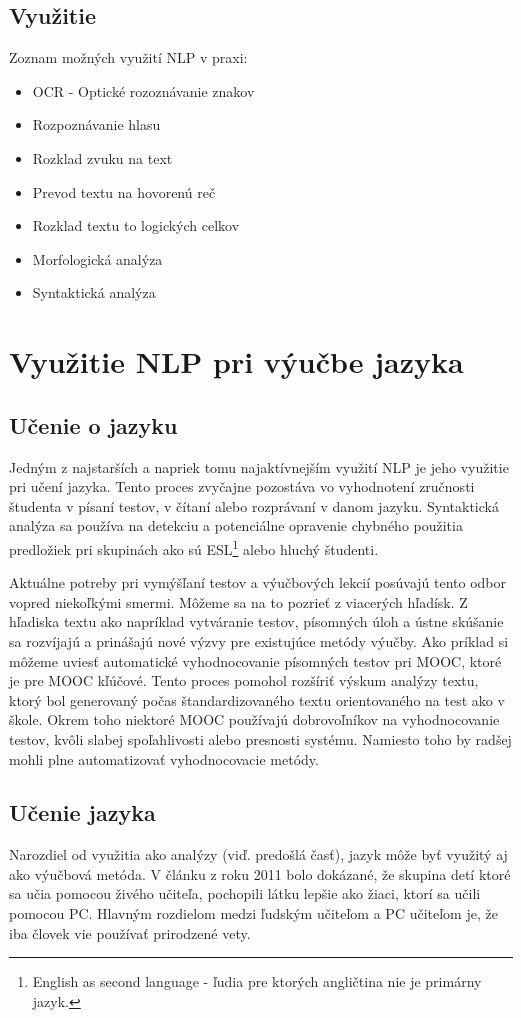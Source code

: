 \documentclass[10pt,slovak,a4paper,twoside]{article}
\begin{document}
\subsection{Využitie}
Zoznam možných využití NLP v praxi:
\begin{itemize}
	\item OCR - Optické rozoznávanie znakov
	\item Rozpoznávanie hlasu
	\item Rozklad zvuku na text
	\item Prevod textu na hovorenú reč
	\item Rozklad textu to logických celkov
	\item Morfologická analýza
	\item Syntaktická analýza
\end{itemize}
\section{Využitie NLP pri výučbe jazyka}\label{vyuzitie_jazyka_nlp}
\subsection{Učenie o jazyku} \label{ucenie_o_jazyku}
		Jedným z najstarších a napriek tomu najaktívnejším využití NLP je jeho využitie pri učení jazyka.
	Tento proces zvyčajne pozostáva vo vyhodnotení zručnosti študenta v písaní testov, v čítaní alebo
	rozprávaní v danom jazyku. Syntaktická analýza sa používa na detekciu a potenciálne opravenie chybného použitia
	predložiek pri skupinách ako sú ESL\footnote{English as second language - ľudia pre ktorých angličtina nie je primárny jazyk.} alebo hluchý študenti.

	Aktuálne potreby pri vymýšľaní testov a výučbových lekcií posúvajú tento odbor vopred niekoľkými smermi. Môžeme sa na to pozrieť z viacerých hľadísk. 
	Z hľadiska textu ako napríklad vytváranie testov, písomných úloh a ústne skúšanie sa rozvíjajú a prinášajú nové výzvy pre existujúce metódy výučby.
	Ako príklad si môžeme uviesť automatické vyhodnocovanie písomných testov pri MOOC, ktoré je pre MOOC kľúčové. Tento proces pomohol rozšíriť výskum analýzy textu, 
	ktorý bol generovaný počas štandardizovaného textu orientovaného na test ako v škole. Okrem toho niektoré MOOC používajú dobrovoľníkov na vyhodnocovanie testov, 
	kvôli slabej spoľahlivosti alebo presnosti systému. Namiesto toho by radšej mohli plne automatizovať vyhodnocovacie metódy.
\subsection{Učenie jazyka} \label{ucenie_pomocou_nlp}
	Narozdiel od využitia ako analýzy (viď. predošlá časť), jazyk môže byť využitý aj ako výučbová metóda.
	V článku z roku 2011\cite{clanok_o_studovani} bolo dokázané, že skupina detí ktoré sa učia pomocou živého učiteľa, 
	pochopili látku lepšie ako žiaci, ktorí sa učili pomocou PC. Hlavným rozdielom medzi ľudským učiteľom a PC učiteľom 
	je, že iba človek vie používať prirodzené vety.
\end{document}
